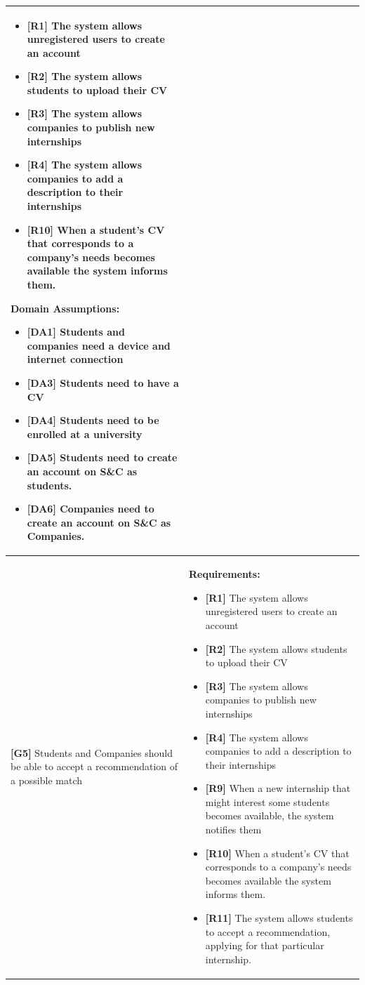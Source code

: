 \begin{longtable}{|p{}|p{}|}
\begin{itemize}
    \item \textbf{[R1]} The system allows unregistered users to create an account
    \item \textbf{[R2]} The system allows students to upload their CV
    \item \textbf{[R3]} The system allows companies to publish new internships
    \item \textbf{[R4]} The system allows companies to add a description to their internships
    \item \textbf{[R10]} When a student’s CV that corresponds to a company’s needs becomes available the system informs them.
\end{itemize}
\textbf{Domain Assumptions:}
\begin{itemize}
    \item \textbf{[DA1]} Students and companies need a device and internet connection
    \item \textbf{[DA3]} Students need to have a CV
     \item \textbf{[DA4]} Students need to be enrolled at a university
    \item \textbf{[DA5]} Students need to create an account on S\&C as students.
    \item \textbf{[DA6]} Companies need to create an account on S\&C as Companies.
\end{itemize} \\
\hline
\textbf{[G5]} Students and Companies should be able to accept a recommendation of a possible match
& 
\textbf{Requirements:}
\begin{itemize}
    \item \textbf{[R1]} The system allows unregistered users to create an account
    \item \textbf{[R2]} The system allows students to upload their CV
    \item \textbf{[R3]} The system allows companies to publish new internships
    \item \textbf{[R4]} The system allows companies to add a description to their internships
    \item  \textbf{[R9]} When a new internship that might interest some students becomes available, the system notifies them
    \item  \textbf{[R10]} When a student’s CV that corresponds to a company’s needs becomes available the system informs them.
    \item  \textbf{[R11]} The system allows students to accept a recommendation, applying for that particular internship.

\end{itemize}
\end{longtable}
